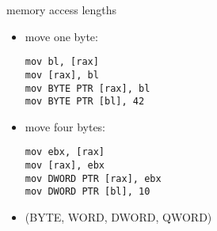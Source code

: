 \begin{frame}[fragile,label=valueLengths]{memory access lengths}
\lstset{language=myasm,style=small}
\begin{itemize}
\item move one byte:
\begin{lstlisting}
mov bl, [rax]
mov [rax], bl
mov BYTE PTR [rax], bl
mov BYTE PTR [bl], 42
\end{lstlisting}
\item move four bytes:
\begin{lstlisting}
mov ebx, [rax]
mov [rax], ebx
mov DWORD PTR [rax], ebx
mov DWORD PTR [bl], 10
\end{lstlisting}
\item (BYTE, WORD, DWORD, QWORD)
\end{itemize}
\end{frame}
